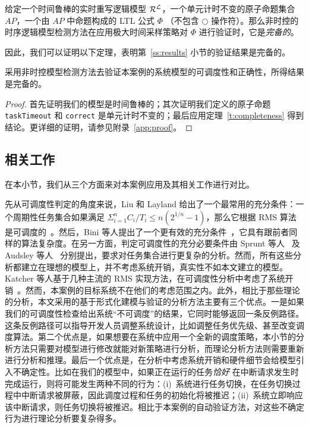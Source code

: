 \begin{theorem}
\label{t:completeness}
给定一个时间鲁棒的实时重写逻辑模型 $\mathcal{R}^{\mathcal{L}}$，一个单元计时不变的原子命题集合 $AP$，一个由 $AP$ 中命题构成的 LTL 公式 $\Phi$ （不包含 $\bigcirc$ 操作符）。那么非时控的时序逻辑模型检测方法在应用极大时间采样策略对 $\Phi$ 进行验证时，它是\emph{完备的}。
\end{theorem}

因此，我们可以证明以下定理，表明第~\ref{ss:results} 小节的验证结果是完备的。
\begin{theorem}
\label{t:main}
采用非时控模型检测方法去验证本案例的系统模型的可调度性和正确性，所得结果是完备的。
\end{theorem}
\begin{proof}
首先证明我们的模型是时间鲁棒的；其次证明我们定义的原子命题 \verb|taskTimeout| 和 \verb|correct| 是单元计时不变的；最后应用定理~\ref{t:completeness} 得到结论。更详细的证明，请参见附录~\ref{app:proof}。
\end{proof}




\subsection{相关工作}
\label{s:relate}
在本小节，我们从三个方面来对本案例应用及其相关工作进行对比。

先从可调度性判定的角度来说，Liu 和 Layland 给出了一个最常用的充分条件：一个周期性任务集合如果满足 $\Sigma^n_{i=1} C_i/T_i \le n(2^{1/n}-1)$，那么它根据 RMS 算法是可调度的~\cite{DBLP:journals/jacm/LiuL73}。然后，Bini 等人提出了一个更有效的充分条件~\cite{DBLP:journals/tc/BiniBB03}，它具有跟前者同样的算法复杂度。在另一方面，判定可调度性的充分必要条件由 Sprunt 等人~\cite{DBLP:journals/rts/SpruntSL89} 及 Audsley 等人~\cite{audsley1993deadline} 分别提出，要求对任务集合进行更复杂的分析。然而，所有这些分析都建立在理想的模型上，并不考虑系统开销，真实性不如本文建立的模型。Katcher 等人基于几种主流的 RMS 实现方法，在可调度性分析中考虑了系统开销~\cite{DBLP:journals/tse/KatcherAS93}。然而，本案例的目标系统不在他们的考虑范围之内。此外，相比于那些理论的分析，本文采用的基于形式化建模与验证的分析方法主要有三个优点。一是如果我们的可调度性检查给出系统“不可调度”的结果，它同时能够返回一条反例路径。这条反例路径可以指导开发人员调整系统设计，比如调整任务优先级、甚至改变调度算法。第二个优点是，如果想要在系统中应用一个全新的调度策略，本小节的分析方法只需要对模型进行修改就能对新策略进行分析，而理论分析方法则需要重新进行分析和推理。最后一个优点是，在分析中考虑系统开销和硬件细节会给模型引入不确定性。比如在我们的模型中，如果正在运行的任务\emph{恰好} 在中断请求发生时完成运行，则将可能发生两种不同的行为：(i)~系统进行任务切换，在任务切换过程中中断请求被屏蔽，因此调度过程和任务的初始化将被推迟；(ii)~系统立即响应该中断请求，则任务切换将被推迟。相比于本案例的自动验证方法，对这些不确定行为进行理论分析要复杂得多。

